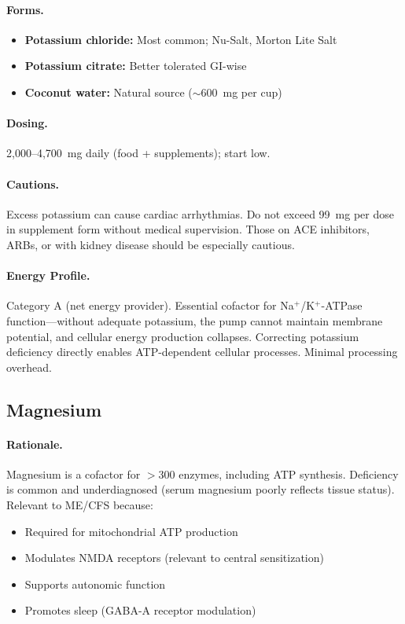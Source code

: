 \paragraph{Forms.}
\begin{itemize}
    \item \textbf{Potassium chloride:} Most common; Nu-Salt, Morton Lite Salt
    \item \textbf{Potassium citrate:} Better tolerated GI-wise
    \item \textbf{Coconut water:} Natural source ($\sim$600~mg per cup)
\end{itemize}

\paragraph{Dosing.} 2,000--4,700~mg daily (food + supplements); start low.

\paragraph{Cautions.} Excess potassium can cause cardiac arrhythmias. Do not exceed 99~mg per dose in supplement form without medical supervision. Those on ACE inhibitors, ARBs, or with kidney disease should be especially cautious.

\paragraph{Energy Profile.}
Category A (net energy provider). Essential cofactor for Na$^+$/K$^+$-ATPase function---without adequate potassium, the pump cannot maintain membrane potential, and cellular energy production collapses. Correcting potassium deficiency directly enables ATP-dependent cellular processes. Minimal processing overhead.

\subsection{Magnesium}

\paragraph{Rationale.} Magnesium is a cofactor for $>$300 enzymes, including ATP synthesis. Deficiency is common and underdiagnosed (serum magnesium poorly reflects tissue status). Relevant to ME/CFS because:
\begin{itemize}
    \item Required for mitochondrial ATP production
    \item Modulates NMDA receptors (relevant to central sensitization)
    \item Supports autonomic function
    \item Promotes sleep (GABA-A receptor modulation)
\end{itemize}

